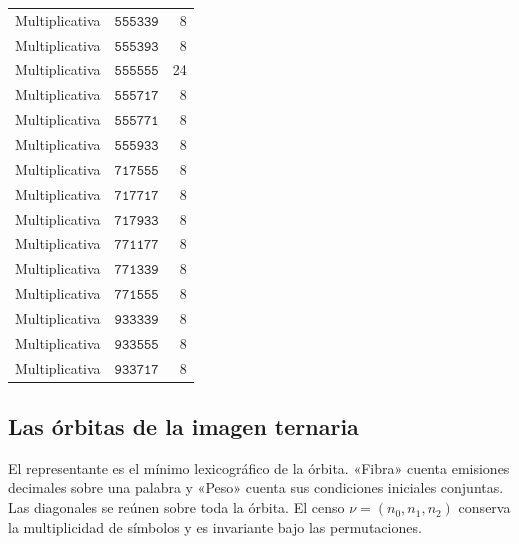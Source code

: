 \begin{longtable}{@{}llr@{}}
Multiplicativa&\(\mathtt{555339}\)&8\\
Multiplicativa&\(\mathtt{555393}\)&8\\
Multiplicativa&\(\mathtt{555555}\)&24\\
Multiplicativa&\(\mathtt{555717}\)&8\\
Multiplicativa&\(\mathtt{555771}\)&8\\
Multiplicativa&\(\mathtt{555933}\)&8\\
Multiplicativa&\(\mathtt{717555}\)&8\\
Multiplicativa&\(\mathtt{717717}\)&8\\
Multiplicativa&\(\mathtt{717933}\)&8\\
Multiplicativa&\(\mathtt{771177}\)&8\\
Multiplicativa&\(\mathtt{771339}\)&8\\
Multiplicativa&\(\mathtt{771555}\)&8\\
Multiplicativa&\(\mathtt{933339}\)&8\\
Multiplicativa&\(\mathtt{933555}\)&8\\
Multiplicativa&\(\mathtt{933717}\)&8\\
\bottomrule
\end{longtable}



\subsection{Las órbitas de la imagen ternaria}
El representante es el mínimo lexicográfico de la órbita. «Fibra»
cuenta emisiones decimales sobre una palabra y «Peso» cuenta sus
condiciones iniciales conjuntas. Las diagonales se reúnen sobre
toda la órbita. El censo \(\nu=(n_0,n_1,n_2)\) conserva la
multiplicidad de símbolos y es invariante bajo las permutaciones.

